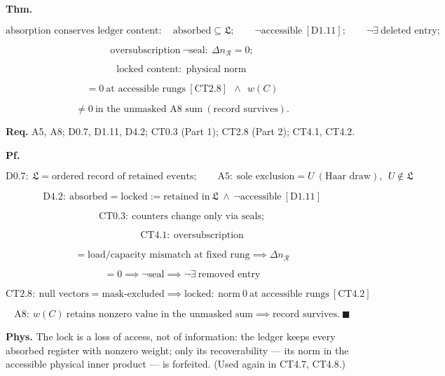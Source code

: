 \begin{theorem}\label{tag:CT4-3}
\textbf{Thm.}

\[
\text{absorption conserves ledger content}:\quad\text{absorbed}\subseteq\mathfrak L;\qquad\neg\text{accessible}\ [\mathrm{D1.11}];\qquad\neg\exists\ \text{deleted entry};
\]

\[
\text{oversubscription}\ \neg\text{seal}:\ \Delta n_{\mathcal R}=0;
\]

\[
\text{locked content}:\ \ \text{physical norm}
\]

\[
= 0\ \text{at accessible rungs}\ [\mathrm{CT2.8}]\ \ \wedge\ \ w(C)
\]

\[
\ne 0\ \text{in the unmasked A8 sum}\ (\text{record survives}).
\]

\textbf{Req.} A5, A8; D0.7, D1.11, D4.2; CT0.3 (Part 1); CT2.8 (Part 2); CT4.1, CT4.2.

\textbf{Pf.}

\[
\mathrm{D0.7}:\ \mathfrak L=\text{ordered record of retained events};\qquad
\mathrm{A5}:\ \text{sole exclusion}=U\ (\text{Haar draw}),\ \ U\notin\mathfrak L
\]

\[
\mathrm{D4.2}:\ \text{absorbed}=\text{locked}:=\text{retained in}\ \mathfrak L\ \wedge\ \neg\text{accessible}\ [\mathrm{D1.11}]
\]

\[
\mathrm{CT0.3}:\ \text{counters change only via seals};
\]

\[
\qquad \mathrm{CT4.1}:\ \text{oversubscription}
\]

\[
= \text{load/capacity mismatch at fixed rung}\implies\Delta n_{\mathcal R}
\]

\[
= 0\implies\neg\text{seal}\implies\neg\exists\ \text{removed entry}
\]

\[
\mathrm{CT2.8}:\ \text{null vectors}=\text{mask-excluded}\implies\text{locked}:\ \text{norm}\ 0\ \text{at accessible rungs}\ [\mathrm{CT4.2}]
\]

\[
\mathrm{A8}:\ w(C)\ \text{retains nonzero value in the unmasked sum}\implies\text{record survives}.\ \blacksquare
\]

\textbf{Phys.} The lock is a loss of access, not of information: the ledger keeps every absorbed register with nonzero weight; only its recoverability — its norm in the accessible physical inner product — is forfeited. (Used again in CT4.7, CT4.8.)

\end{theorem}

